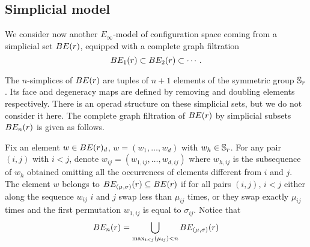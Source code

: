 \subsection{Simplicial model}\label{ss:simplicial model}

We consider now another $E_\infty$-model of  configuration space coming from a simplicial set $BE(r)$, equipped with a complete graph filtration
\[
BE_{1}(r) \subset BE_{2}(r) \subset \dotsb \,.
\]

The $n$-simplices of $BE(r)$ are tuples of $n+1$ elements of the symmetric group $\mathbb{S}_r$.
Its face and degeneracy maps are defined by removing and doubling elements respectively.
There is an operad structure on these simplicial sets, but we do not consider it here.
The complete graph filtration of $BE(r)$ by simplicial subsets $BE_n(r)$ is given as follows.

\begin{definition}
	Fix an element $w \in BE(r)_{d}$, $w=(w_{1},\dots , w_{d})$ with $w_{h}\in \mathbb{S}_r$.
 	For any pair $(i,j)$ with $i< j$, denote $w_{ij}=(w_{1,ij},\dots , w_{d,ij})$ where $w_{h,ij}$ is the subsequence of $w_{h}$ obtained omitting all the occurrences of elements different from $i$ and $j$.
	The element $w$ belongs to $BE_{(\mu,\sigma)}(r)\subseteq BE(r)$ if for all pairs $(i,j)$, $i< j$ either along the sequence $w_{ij}$ $i$ and $j$ swap less than $\mu_{ij}$ times,
	or they swap exactly $\mu_{ij}$ times and the first permutation $w_{1,ij}$ is equal to $\sigma_{ij}$.
	Notice that
	\begin{equation*}
		\label{def}
		BE_{n}(r)=\bigcup_{\max_{i<j} (\mu_{ij})< n} BE_{(\mu,\sigma)}(r)
	\end{equation*}
\end{definition}

